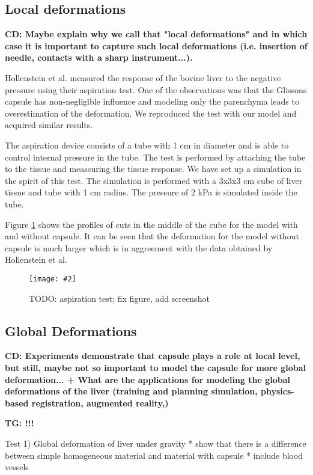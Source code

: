\documentclass{llncs}
\newcommand{\TG}[1]{{\color{blue}\textbf{TG: #1}}}
\newcommand{\CD}[1]{{\color{green}\textbf{CD: #1}}}
\newcommand{\Figure}[3]{%
\begin{figure}[htb]
  \centering
  \texttt{[image: \#2]}
  \caption{\label{fig-#2}#3}
\end{figure}}
\begin{document}
\subsection{Local deformations} %

\CD{Maybe explain why we call that "local deformations" and in which case it is important to capture such local deformations (i.e. insertion of needle, contacts with a sharp instrument...).}

Hollenstein et al. \cite{Hollenstein2006} measured the response of the
bovine liver to the negative pressure using their aspiration test. One of
the observations was that the Glissons capsule has non-negligible influence
and modeling only the parenchyma leads to overestimation of the
deformation. We reproduced the test with our model and acquired similar
results.

The aspiration device consists of a tube with 1 cm in diameter and is able
to control internal pressure in the tube. The test is performed by
attaching the tube to the tissue and meassuring the tissue response. We
have set up a simulation in the spirit of this test. 
The simulation is performed with a 3x3x3 cm cube of liver tissue and tube
with 1 cm radius. The pressure of 2 kPa is simulated inside the tube.

Figure \ref{fig-aspiration} shows the profiles of cuts in the middle of the
cube for the model with and without capsule. It can be seen that the
deformation for the model without capsule is much larger which is in
aggreement with the data obtained by Hollenstein et al.

\Figure{4in}{aspiration}{TODO: aspiration test; fix figure, add screenshot}





\subsection{Global Deformations}
\CD{ Experiments demonstrate that capsule plays a role at local level, but still, maybe not so important to model the capsule for more global deformation...
+ What are the applications for modeling the global deformations of the liver (training and planning simulation, physics-based registration, augmented reality,)}


\TG{!!!}

Test 1) Global deformation of liver under gravity
  * show that there is a difference between simple homogeneous material
    and material with capsule
  * include blood vessels
\end{document}
